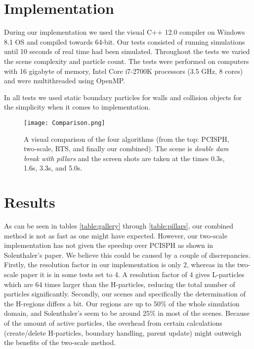 \documentclass[../../main.tex]{subfiles}
\begin{document}


\section{Implementation}

During our implementation we used the visual C++ 12.0 compiler on Windows 8.1 OS and compiled towards 64-bit. Our tests consisted of running simulations until 10 seconds of real time had been simulated. Throughout the tests we varied the scene complexity and particle count. The tests were performed on computers with 16 gigabyte of memory, Intel Core i7-2700K processors (3.5 GHz, 8 cores) and were multithreaded using OpenMP. 

In all tests we used static boundary particles for walls and collision objects for the simplicity when it comes to implementation. 

\begin{figure}[h!]
    \centering
    \texttt{[image: Comparison.png]}
    \caption[Visual comparison of the algorithms]{A visual comparison of the four algorithms (from the top: PCISPH, two-scale, RTS, and finally our combined). The scene is \textit{double dam break with pillars} and the screen shots are taken at the times 0.3s, 1.6s, 3.3s, and 5.0s. }
    \label{fig:comparison}
\end{figure}

\section{Results}

As can be seen in tables \ref{table:gallery} through \ref{table:pillars}, our combined method is not as fast as one might have expected. However, our two-scale implementation has not given the speedup over PCISPH as shown in Solenthaler's paper. We believe this could be caused by a couple of discrepancies. Firstly, the resolution factor in our implementation is only 2, whereas in the two-scale paper it is in some tests set to 4. A resolution factor of 4 gives L-particles which are 64 times larger than the H-particles, reducing the total number of particles significantly. Secondly, our scenes and specifically the determination of the H-regions differs a bit. Our regions are up to 50\% of the whole simulation domain, and Solenthaler's seem to be around 25\% in most of the scenes. Because of the amount of active particles, the overhead from certain calculations (create/delete H-particles, boundary handling, parent update) might outweigh the benefits of the two-scale method. 
\end{document}
